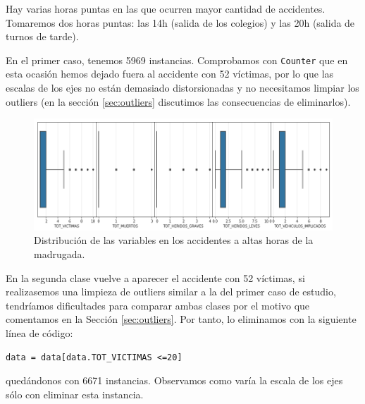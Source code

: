 \documentclass[oneside]{book}
\begin{document}
Hay varias horas puntas en las que ocurren mayor cantidad de
accidentes. Tomaremos dos horas puntas: las 14h (salida de los
colegios) y las 20h (salida de turnos de tarde).

En el primer caso, tenemos 5969 instancias. Comprobamos con
\texttt{Counter} que en esta ocasión hemos dejado fuera al accidente
con 52 víctimas, por lo que las escalas de los ejes no están demasiado
distorsionadas y no necesitamos limpiar los outliers (en la sección
\ref{sec:outliers} discutimos las consecuencias de eliminarlos).

\begin{figure}[H]
  \centering
  \includegraphics[width=160mm]{figures/accidentes/distrib-madrugada}
  \caption{Distribución de las variables en los accidentes a altas horas de la madrugada.}
  \label{fig:distrib-madrugada}
\end{figure}

En la segunda clase vuelve a aparecer el accidente con 52 víctimas, si
realizasemos una limpieza de outliers similar a la del primer caso de
estudio, tendríamos dificultades para comparar ambas clases por el
motivo que comentamos en la Sección \ref{sec:outliers}. Por tanto, lo
eliminamos con la siguiente línea de código:
\begin{verbatim}
data = data[data.TOT_VICTIMAS <=20]
\end{verbatim}
quedándonos con 6671 instancias. Observamos como varía la escala de
los ejes sólo con eliminar esta instancia.
\end{document}
